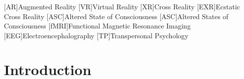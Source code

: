 \documentclass{UIdahoMastersThesis}
\begin{document}
\begin{acronym}[fMRI]  %
	[{\textup{AR}}]{Augmented Reality}
	[{\textup{VR}}]{Virtual Reality}
	[{\textup{XR}}]{Cross Reality}
	[{\textup{EXR}}]{Ecstatic Cross Reality}
	[{\textup{ASC}}]{Altered State of Consciousness}
	[{\textup{ASC}}]{Altered States of Consciousness}
	[{\textup{fMRI}}]{Functional Magnetic Resonance Imaging}
	[{\textup{EEG}}]{Electroencephalography}
	[{\textup{TP}}]{Transpersonal Psychology}
\end{acronym}



\mainmatter  %
\setcounter{secnumdepth}{1}  %




\clearpage
\chapter{Introduction}
\label{Chapter:Introduction}

\acresetall  %

\end{document}
